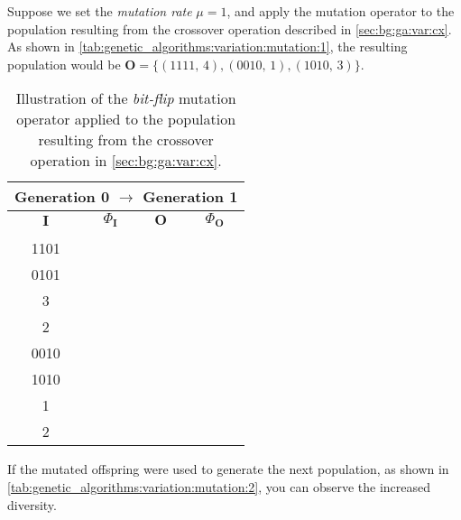   Suppose we set the \emph{mutation rate} \(\mu = 1\), and apply the mutation 
  operator to the population resulting from the crossover operation described in
  \vref{sec:bg:ga:var:cx}.
  As shown in \vref{tab:genetic_algorithms:variation:mutation:1}, the resulting 
  population would be 
  \(\mathbf{O} = \{(1111,\, 4), (0010,\, 1), (1010,\, 3)\}\).

  
  \begin{table}[ht!]
    \centering
    \begin{tabular}{|c|c|c|c|}
      \multicolumn{4}{c}{\textbf{Generation 0} \(\to\) \textbf{Generation 1}} \\
      \hline
      \hline
      \(\mathbf{I}\) & \(\Phi_\mathbf{I}\) & \(\mathbf{O}\) & \(\Phi_\mathbf{O}\) \\
      \hline
      \Gape[2pt][2pt]{\(\begin{bmatrix} 0000 \\ 1101 \\ 0101 \end{bmatrix}\)}
        & \(\begin{bmatrix} 0 \\ 3 \\ 2 \end{bmatrix}\)
        & \(\begin{bmatrix} 1111 \\ 0010 \\ 1010 \end{bmatrix}\) 
        & \(\begin{bmatrix} 4 \\ 1 \\ 2 \end{bmatrix}\) \\[1em]
      \hline
    \end{tabular}
    \caption{
      Illustration of the \emph{bit-flip} mutation operator applied to the 
      population resulting from the crossover operation in 
      \vref{sec:bg:ga:var:cx}.
    }
    \label{tab:genetic_algorithms:variation:crossover:mutation}
  \end{table}

  If the mutated offspring were used to generate the next population, as shown 
  in \vref{tab:genetic_algorithms:variation:mutation:2}, you can observe the 
  increased diversity.

